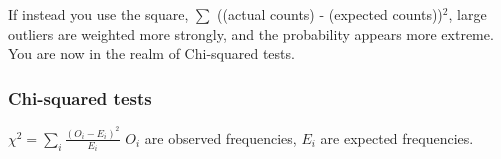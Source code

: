 If instead you use the square, $\sum$ ((actual counts) - (expected counts))$^2$, large outliers are weighted more strongly, and the probability appears more extreme. 
You are now in the realm of Chi-squared tests.

\subsubsection{Chi-squared tests}
$\displaystyle \chi^2 = \sum_i \frac{(O_i - E_i)^2}{E_i}$
$O_i$ are observed frequencies, $E_i$ are expected frequencies. 
